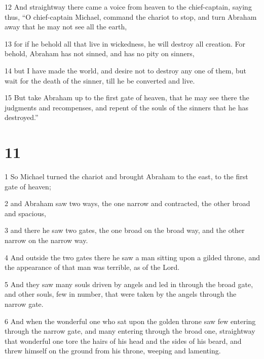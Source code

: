 \par 12 And straightway there came a voice from heaven to the chief-captain, saying thus, “O chief-captain Michael, command the chariot to stop, and turn Abraham away that he may not see all the earth, 

\par 13 for if he behold all that live in wickedness, he will destroy all creation. For behold, Abraham has not sinned, and has no pity on sinners, 

\par 14 but I have made the world, and desire not to destroy any one of them, but wait for the death of the sinner, till he be converted and live. 

\par 15 But take Abraham up to the first gate of heaven, that he may see there the judgments and recompenses, and repent of the souls of the sinners that he has destroyed.”

\chapter{11}

\par 1 So Michael turned the chariot and brought Abraham to the east, to the first gate of heaven; 

\par 2 and Abraham saw two ways, the one narrow and contracted, the other broad and spacious, 

\par 3 and there he saw two gates, the one broad on the broad way, and the other narrow on the narrow way. 

\par 4 And outside the two gates there he saw a man sitting upon a gilded throne, and the appearance of that man was terrible, as of the Lord. 

\par 5 And they saw many souls driven by angels and led in through the broad gate, and other souls, few in number, that were taken by the angels through the narrow gate. 

\par 6 And when the wonderful one who sat upon the golden throne saw few entering through the narrow gate, and many entering through the broad one, straightway that wonderful one tore the hairs of his head and the sides of his beard, and threw himself on the ground from his throne, weeping and lamenting. 

